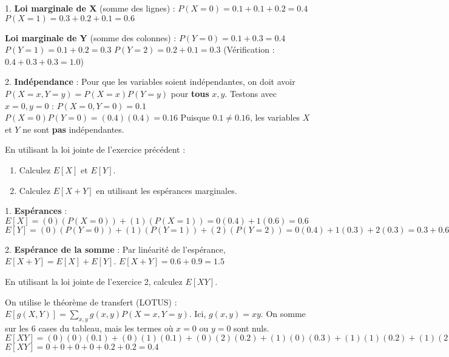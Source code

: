 \begin{correctionbox}
1. \textbf{Loi marginale de X} (somme des lignes) :
$P(X=0) = 0.1 + 0.1 + 0.2 = 0.4$
$P(X=1) = 0.3 + 0.2 + 0.1 = 0.6$

\textbf{Loi marginale de Y} (somme des colonnes) :
$P(Y=0) = 0.1 + 0.3 = 0.4$
$P(Y=1) = 0.1 + 0.2 = 0.3$
$P(Y=2) = 0.2 + 0.1 = 0.3$
(Vérification : $0.4+0.3+0.3=1.0$)

2. \textbf{Indépendance} :
Pour que les variables soient indépendantes, on doit avoir $P(X=x, Y=y) = P(X=x)P(Y=y)$ pour \textbf{tous} $x, y$.
Testons avec $x=0, y=0$ :
$P(X=0, Y=0) = 0.1$
$P(X=0)P(Y=0) = (0.4)(0.4) = 0.16$
Puisque $0.1 \neq 0.16$, les variables $X$ et $Y$ ne sont \textbf{pas} indépendantes.
\end{correctionbox}

\begin{exercicebox}
En utilisant la loi jointe de l'exercice précédent :
\begin{enumerate}
    \item Calculez $E[X]$ et $E[Y]$.
    \item Calculez $E[X+Y]$ en utilisant les espérances marginales.
\end{enumerate}
\end{exercicebox}

\begin{correctionbox}
1. \textbf{Espérances} :
$E[X] = (0)(P(X=0)) + (1)(P(X=1)) = 0(0.4) + 1(0.6) = 0.6$
$E[Y] = (0)(P(Y=0)) + (1)(P(Y=1)) + (2)(P(Y=2)) = 0(0.4) + 1(0.3) + 2(0.3) = 0.3 + 0.6 = 0.9$

2. \textbf{Espérance de la somme} :
Par linéarité de l'espérance, $E[X+Y] = E[X] + E[Y]$.
$E[X+Y] = 0.6 + 0.9 = 1.5$
\end{correctionbox}

\begin{exercicebox}
En utilisant la loi jointe de l'exercice 2, calculez $E[XY]$.
\end{exercicebox}

\begin{correctionbox}
On utilise le théorème de transfert (LOTUS) : $E[g(X,Y)] = \sum_{x,y} g(x,y) P(X=x, Y=y)$.
Ici, $g(x,y) = xy$. On somme sur les 6 cases du tableau, mais les termes où $x=0$ ou $y=0$ sont nuls.
$E[XY] = (0)(0)(0.1) + (0)(1)(0.1) + (0)(2)(0.2) + (1)(0)(0.3) + (1)(1)(0.2) + (1)(2)(0.1)$
$E[XY] = 0 + 0 + 0 + 0 + 0.2 + 0.2 = 0.4$
\end{correctionbox}

